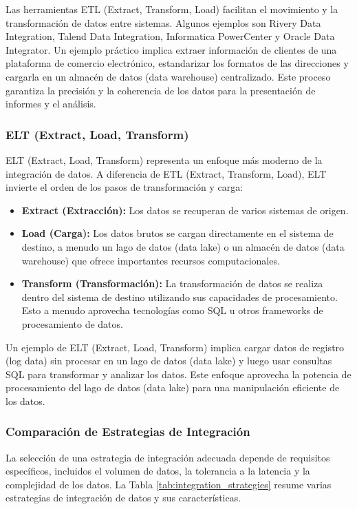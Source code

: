 \documentclass[12pt]{book}
\begin{document}
Las herramientas ETL (Extract, Transform, Load) facilitan el movimiento y la transformación de datos entre sistemas. Algunos ejemplos son Rivery Data Integration, Talend Data Integration, Informatica PowerCenter y Oracle Data Integrator. Un ejemplo práctico implica extraer información de clientes de una plataforma de comercio electrónico, estandarizar los formatos de las direcciones y cargarla en un almacén de datos (data warehouse) centralizado. Este proceso garantiza la precisión y la coherencia de los datos para la presentación de informes y el análisis.

\subsubsection{ELT (Extract, Load, Transform)}

ELT (Extract, Load, Transform) representa un enfoque más moderno de la integración de datos. A diferencia de ETL (Extract, Transform, Load), ELT invierte el orden de los pasos de transformación y carga:

\begin{itemize}
    \item \textbf{Extract (Extracción):} Los datos se recuperan de varios sistemas de origen.
    \item \textbf{Load (Carga):} Los datos brutos se cargan directamente en el sistema de destino, a menudo un lago de datos (data lake) o un almacén de datos (data warehouse) que ofrece importantes recursos computacionales.
    \item \textbf{Transform (Transformación):} La transformación de datos se realiza dentro del sistema de destino utilizando sus capacidades de procesamiento. Esto a menudo aprovecha tecnologías como SQL u otros frameworks de procesamiento de datos.
\end{itemize}

Un ejemplo de ELT (Extract, Load, Transform) implica cargar datos de registro (log data) sin procesar en un lago de datos (data lake) y luego usar consultas SQL para transformar y analizar los datos. Este enfoque aprovecha la potencia de procesamiento del lago de datos (data lake) para una manipulación eficiente de los datos.

\subsubsection{Comparación de Estrategias de Integración}

La selección de una estrategia de integración adecuada depende de requisitos específicos, incluidos el volumen de datos, la tolerancia a la latencia y la complejidad de los datos. La Tabla \ref{tab:integration_strategies} resume varias estrategias de integración de datos y sus características.
\end{document}
